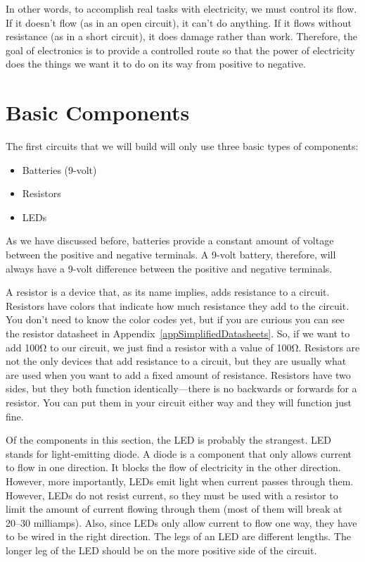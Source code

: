 In other words, to accomplish real tasks with electricity, we must control its flow.  
If it doesn't flow (as in an open circuit), it can't do anything.
If it flows without resistance (as in a short circuit), it does damage rather than work.
Therefore, the goal of electronics is to provide a controlled route so that the power of electricity does the things we want it to do on its way from positive to negative.

\section{Basic Components}

The first circuits that we will build will only use three basic types of components:
\begin{itemize}
\item Batteries (9-volt)
\item Resistors
\item LEDs
\end{itemize}

As we have discussed before, batteries provide a constant amount of voltage between the positive and negative terminals.
A 9-volt battery, therefore, will always have a 9-volt difference between the positive and negative terminals.

A resistor is a device that, as its name implies, adds resistance to a circuit.
Resistors have colors that indicate how much resistance they add to the circuit.
You don't need to know the color codes yet, but if you are curious you can see the resistor datasheet in Appendix~\ref{appSimplifiedDatasheets}.
So, if we want to add 100\si{\ohm} to our circuit, we just find a resistor with a value of 100\si{\ohm}.
Resistors are not the only devices that add resistance to a circuit, but they are usually what are used when you want to add a fixed amount of resistance.
Resistors have two sides, but they both function identically---there is no backwards or forwards for a resistor.  
You can put them in your circuit either way and they will function just fine.

Of the components in this section, the LED is probably the strangest.
LED stands for light-emitting diode.
A diode is a component that only allows current to flow in one direction.
It blocks the flow of electricity in the other direction.
However, more importantly, LEDs emit light when current passes through them.
However, LEDs do not resist current, so they must be used with a resistor to limit the amount of current flowing through them (most of them will break at 20--30 milliamps).
Also, since LEDs only allow current to flow one way, they have to be wired in the right direction.
The legs of an LED are different lengths.
The longer leg of the LED should be on the more positive side of the circuit.

